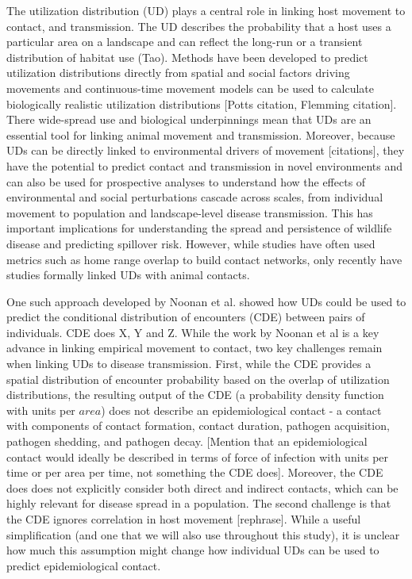 \documentclass[letterpaper]{article}
\begin{document}

The utilization distribution (UD) plays a central role in linking host movement to contact, and transmission.  The UD describes the probability that a host uses a particular area on a landscape and can reflect the long-run or a transient distribution of habitat use (Tao). Methods have been developed to predict utilization distributions directly from spatial and social factors driving movements and continuous-time movement models can be used to calculate biologically realistic utilization distributions [Potts citation, Flemming citation].  There wide-spread use and biological underpinnings mean that UDs are an essential tool for linking animal movement and transmission.  Moreover, because UDs can be directly linked to environmental drivers of movement [citations], they have the potential to predict contact and transmission in novel environments and can also be used for prospective analyses to understand how the effects of environmental and social perturbations cascade across scales, from individual movement to population and landscape-level disease transmission.  This has important implications for understanding the spread and persistence of wildlife disease and predicting spillover risk.  However, while studies have often used metrics such as home range overlap to build contact networks, only recently have studies formally linked UDs with animal contacts. 

One such approach developed by Noonan et al. showed how UDs could be used to predict the conditional distribution of encounters (CDE) between pairs of individuals. CDE does X, Y and Z. While the work by Noonan et al is a key advance in linking empirical movement to contact, two key challenges remain when linking UDs to disease transmission.  First, while the CDE provides a spatial distribution of encounter probability based on the overlap of utilization distributions, the resulting output of the CDE (a probability density function with units per $area$) does not describe an epidemiological contact - a contact with components of contact formation, contact duration, pathogen acquisition, pathogen shedding, and pathogen decay.  [Mention that an epidemiological contact would ideally be described in terms of force of infection with units per time or per area per time, not something the CDE does].  Moreover, the CDE does does not explicitly consider both direct and indirect contacts, which can be highly relevant for disease spread in a population. The second challenge is that the CDE ignores correlation in host movement [rephrase].  While a useful simplification (and one that we will also use throughout this study), it is unclear how much this assumption might change how individual UDs can be used to predict epidemiological contact.  
\end{document}
